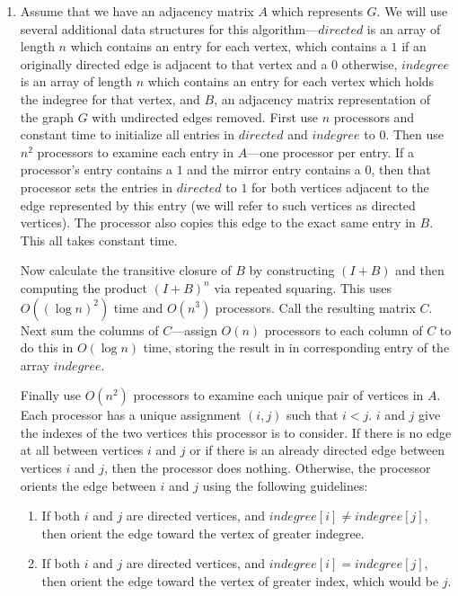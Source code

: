 \documentclass{article}
\begin{document}
\begin{enumerate}
\begin{enumerate}
\item Assume that we have an adjacency matrix $A$ which represents $G$. We will use several additional data structures for this algorithm---$directed$ is an array of length $n$ which contains an entry for each vertex, which contains a $1$ if an originally directed edge is adjacent to that vertex and a $0$ otherwise, $indegree$ is an array of length $n$ which contains an entry for each vertex which holds the indegree for that vertex, and $B$, an adjacency matrix representation of the graph $G$ with undirected edges removed.  First use $n$ processors and constant time to initialize all entries in $directed$ and $indegree$ to $0$. Then use $n^2$ processors to examine each entry in $A$---one processor per entry.  If a processor's entry contains a $1$ and the mirror entry contains a $0$, then that processor sets the entries in $directed$ to $1$ for both vertices adjacent to the edge represented by this entry (we will refer to such vertices as directed vertices). The processor also copies this edge to the exact same entry in $B$. This all takes constant time.

\par Now calculate the transitive closure of $B$ by constructing $(I+B)$ and then computing the product $(I+B)^n$ via repeated squaring. This uses $O((\log n)^2)$ time and $O(n^3)$ processors. Call the resulting matrix $C$. Next sum the columns of $C$---assign $O(n)$ processors to each column of $C$ to do this in $O(\log n)$ time, storing the result in in corresponding entry of the array $indegree$.

\par Finally use $O(n^2)$ processors to examine each unique pair of vertices in $A$. Each processor has a unique assignment $(i,j)$ such that $i \lt j$. $i$ and $j$ give the indexes of the two vertices this processor is to consider. If there is no edge at all between vertices $i$ and $j$ or if there is an already directed edge between vertices $i$ and $j$, then the processor does nothing. Otherwise, the processor orients the edge between $i$ and $j$ using the following guidelines:
\begin{enumerate}
		\item If both $i$ and $j$ are directed vertices, and $indegree[i] \neq indegree[j]$, then orient the edge toward the vertex of greater indegree.
		
		\item If both $i$ and $j$ are directed vertices, and $indegree[i] = indegree[j]$, then orient the edge toward the vertex of greater index, which would be $j$.
		

\end{enumerate}
\end{enumerate}
\end{enumerate}
\end{document}
